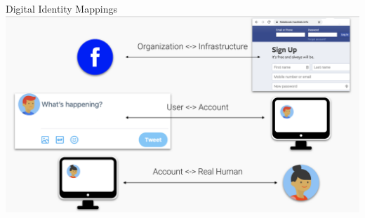 \documentclass[nobackground,dvipsnames,table,aspectratio=169]{beamer}
\begin{document}
\begin{frame}{Digital Identity Mappings}
    \includegraphics[width=\textwidth]{digital-identity-mappings}
\end{frame}
\end{document}

